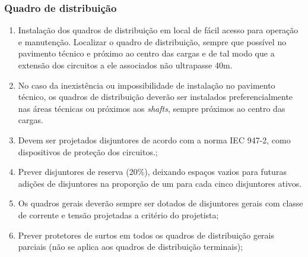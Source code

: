 \subsubsection{Quadro de distribuição} \label{switchboard: distribuicao}

\begin{enumerate}

	\item Instalação dos quadros de distribuição em local de fácil acesso para operação e manutenção. Localizar o quadro de distribuição, sempre que possível no pavimento técnico e próximo ao centro das cargas e de tal modo que a extensão dos circuitos a ele associados não ultrapasse 40m.
	
	\item No caso da inexistência ou impossibilidade de instalação no pavimento técnico, os quadros de distribuição deverão ser instalados preferencialmente nas áreas técnicas ou próximos aos \textit{shafts}, sempre próximos ao centro das cargas.
	
	\item Devem ser projetados disjuntores de acordo com a norma IEC 947-2, como dispositivos de proteção dos circuitos.;
	
	\item Prever disjuntores de reserva (20\%), deixando espaços vazios para futuras adições de disjuntores na proporção de um para cada cinco disjuntores ativos.
	
	\item Os quadros gerais deverão sempre ser dotados de disjuntores gerais com classe de corrente e tensão projetadas a critério do projetista;
	
	\item Prever protetores de surtos em todos os quadros de distribuição gerais parciais (não se aplica aos quadros de distribuição terminais);

\end{enumerate}